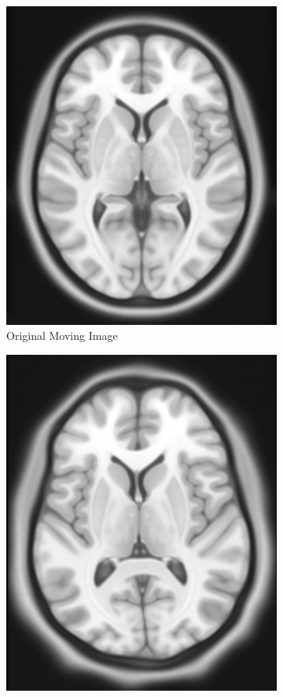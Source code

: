 \documentclass{standalone}
\begin{document}
\begin{figure}[h!]
\begin{subfigure}[b]{0.325\textwidth}
             \includegraphics[scale=0.194]{img/Chap2/atlas.jpg}
             \caption{Original Moving Image}
             \label{fig:mni}
        \end{subfigure}
        \hfill
        \begin{subfigure}[b]{0.325\textwidth}
             \includegraphics[scale=0.1]{img/Chap2/registered_atlas.jpg}

\end{subfigure}
\end{figure}
\end{document}

